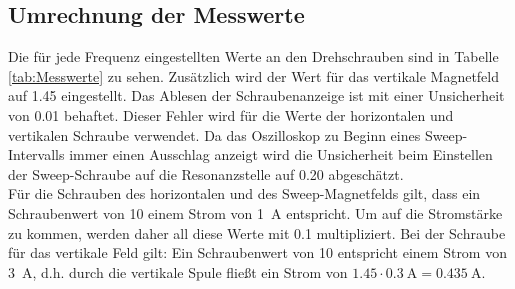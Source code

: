 \subsection{Umrechnung der Messwerte}
Die für jede Frequenz eingestellten Werte an den Drehschrauben sind in Tabelle \ref{tab:Messwerte} zu sehen. Zusätzlich wird der Wert für das vertikale Magnetfeld auf 1.45 eingestellt.
Das Ablesen der Schraubenanzeige ist mit einer Unsicherheit von 0.01 behaftet. Dieser Fehler wird für die Werte der horizontalen und vertikalen Schraube verwendet. Da das Oszilloskop zu Beginn eines Sweep-Intervalls immer einen Ausschlag anzeigt wird die Unsicherheit beim Einstellen der Sweep-Schraube auf die Resonanzstelle auf 0.20 abgeschätzt. \\
Für die Schrauben des horizontalen und des Sweep-Magnetfelds gilt, dass ein Schraubenwert von 10 einem Strom von \SI{1}{\ampere} entspricht. Um auf die Stromstärke zu kommen, werden daher all diese Werte mit 0.1 multipliziert. Bei der Schraube für das vertikale Feld gilt: Ein Schraubenwert von 10 entspricht einem Strom von \SI{3}{\ampere}, d.h. durch die vertikale Spule fließt ein Strom von $1.45\cdot \SI{0.3}{\ampere} = \SI{0.435}{\ampere}$.

